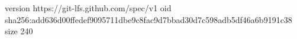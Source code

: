 version https://git-lfs.github.com/spec/v1
oid sha256:add636d00ffedef9095711dbe9c8fac9d7bbad30d7c598adb5df46a6b9191c38
size 240

